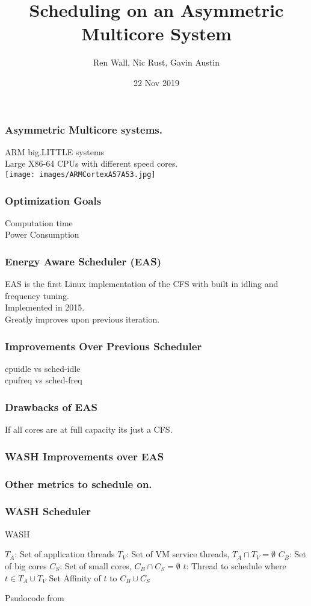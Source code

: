 \documentclass{beamer}
\title{Scheduling on an Asymmetric Multicore System}
\author{Ren Wall, Nic Rust, Gavin Austin}
\institute{}
\date{22 Nov 2019}
\begin{document}
	\frame{\titlepage}
	
	\begin{frame}
		\frametitle{Asymmetric Multicore systems.}
		ARM big.LITTLE systems\\
		Large X86-64 CPUs with different speed cores.\\
		\texttt{[image: images/ARMCortexA57A53.jpg]}
	\end{frame}
	
	\begin{frame}
		\frametitle{Optimization Goals}
		Computation time\\
		Power Consumption\\
	\end{frame}
	
	\begin{frame}
		\frametitle{Energy Aware Scheduler (EAS)}
		EAS is the first Linux implementation of the CFS with built in idling and frequency tuning.\\
		Implemented in 2015.\\
		Greatly improves upon previous iteration.\\
	\end{frame}
	
	\begin{frame}
		\frametitle{Improvements Over Previous Scheduler}
		cpuidle vs sched-idle\\
		cpufreq vs sched-freq\\
	\end{frame}
	
	\begin{frame}
		\frametitle{Drawbacks of EAS}
		If all cores are at full capacity its just a CFS.
	\end{frame}
	
	\begin{frame}
		\frametitle{WASH Improvements over EAS}
	\end{frame}
	
	\begin{frame}
		\frametitle{Other metrics to schedule on.}
	\end{frame}
	
	\begin{frame}
		\frametitle{WASH Scheduler}
		\begin{algorithm}[H]
		\caption{WASH}\label{euclid}
		\begin{algorithmic}
				\State $T_A$: Set of application threads
				\State $T_V$: Set of VM service threads, $T_A \cap T_V = \emptyset$
				\State $C_B$: Set of big cores
				\State $C_S$: Set of small cores, $C_B \cap C_S = \emptyset$
				\State $t$: Thread to schedule where $t \in T_A \cup T_V$
					\EndIf
						\State Set Affinity of $t$ to $C_B \cup C_S$
					\EndIf
				\EndIf
			\EndFunction
		\end{algorithmic}
		\end{algorithm}
		Psudocode from \cite{Jibaja:2016:PPA:2854038.2854047}
	\end{frame}
	
	\begin{frame}
		{}
		
	\end{frame}
\end{document}
